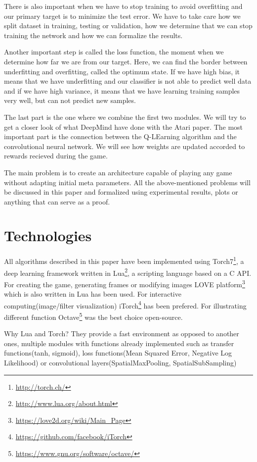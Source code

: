 There is also important when we have to stop training to avoid overfitting and our primary target is to minimize the test error. We have to take care how we split dataset in training, testing or validation, how we determine that we can stop training the network and how we can formalize the results.

Another important step is called the loss function, the moment when we determine how far we are from our target. Here, we can find the border between underfitting and overfitting, called the optimum state. If we have high bias, it means that we have underfitting and our classifier is not able to predict well data and if we have high variance, it means that we have learning training samples very well, but can not predict new samples.

The last part is the one where we combine the first two modules. We will try to get a closer look of what DeepMind have done with the Atari paper\cite{atari}. The most important part is the connection between the Q-LEarning algorithm and the convolutional neural network. We will see how weights are updated accorded to rewards recieved during the game.

The main problem is to create an architecture capable of playing any game without adapting initial meta parameters. All the above-mentioned problems will be discussed in this paper and formalized using experimental results, plots or anything that can serve as a proof.
\newpage

\section{Technologies}
\label{sec:technologies}
All algorithms described in this paper have been implemented using Torch7\footnote{\url{http://torch.ch/}}, a deep learning framework written in Lua\footnote{\url{http://www.lua.org/about.html}}, a scripting language based on a C API. For creating the game, generating frames or modifying images LOVE platform\footnote{\url{https://love2d.org/wiki/Main_Page}} which is also written in Lua has been used. For interactive computing(image/filter visualization) iTorch\footnote{\url{https://github.com/facebook/iTorch}} has been prefered. For illustrating different function Octave\footnote{\url{https://www.gnu.org/software/octave/}} was the best choice open-source.

Why Lua and Torch? They provide a fast environment as opposed to another ones\cite{torch7}, multiple modules with functions already implemented such as transfer functions(tanh, sigmoid), loss functions(Mean Squared Error, Negative Log Likelihood) or convolutional layers(SpatialMaxPooling, SpatialSubSampling)

